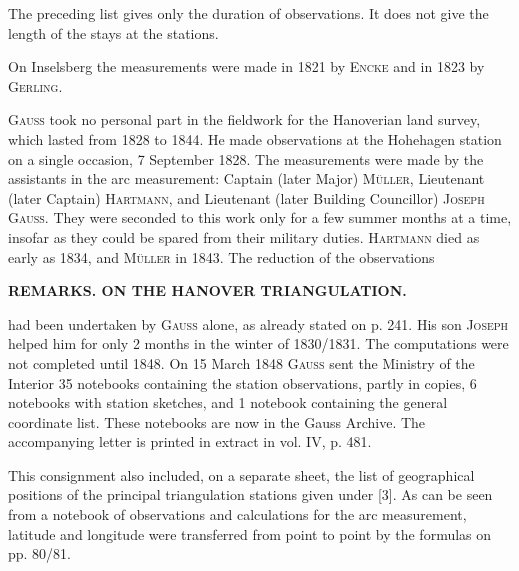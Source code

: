 \par\noindent\hspace*{\parindent}The preceding list gives only the duration of observations. It does not give the length of the stays at the stations.

\par\noindent\hspace*{\parindent}On Inselsberg the measurements were made in 1821 by \textsc{Encke} and in 1823 by \textsc{Gerling}.

\par\noindent\hspace*{\parindent}\textsc{Gauss} took no personal part in the fieldwork for the Hanoverian land survey, which lasted from 1828 to 1844. He made observations at the Hohehagen station on a single occasion, 7 September 1828. The measurements were made by the assistants in the arc measurement: Captain (later Major) \textsc{Müller}, Lieutenant (later Captain) \textsc{Hartmann}, and Lieutenant (later Building Councillor) \textsc{Joseph Gauss}. They were seconded to this work only for a few summer months at a time, insofar as they could be spared from their military duties. \textsc{Hartmann} died as early as 1834, and \textsc{Müller} in 1843. The reduction of the observations
\par\medskip\noindent{}\par

\clearpage
\noindent{}\hfill\textbf{REMARKS. ON THE HANOVER TRIANGULATION.}\hfill\null\par\medskip
\noindent had been undertaken by \textsc{Gauss} alone, as already stated on p. 241. His son \textsc{Joseph} helped him for only 2 months in the winter of 1830/1831. The computations were not completed until 1848. On 15 March 1848 \textsc{Gauss} sent the Ministry of the Interior 35 notebooks containing the station observations, partly in copies, 6 notebooks with station sketches, and 1 notebook containing the general coordinate list. These notebooks are now in the Gauss Archive. The accompanying letter is printed in extract in vol. IV, p. 481.

\par\noindent\hspace*{\parindent}This consignment also included, on a separate sheet, the list of geographical positions of the principal triangulation stations given under [3]. As can be seen from a notebook of observations and calculations for the arc measurement, latitude and longitude were transferred from point to point by the formulas on pp. 80/81.

